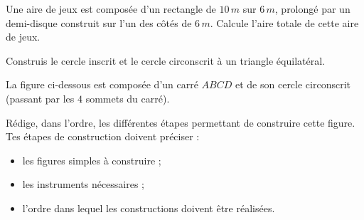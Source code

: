 \documentclass[../../syllabus_1.tex]{subfiles}
\begin{document}
\begin{exercise}
    Une aire de jeux est composée d'un rectangle de $10\,m$ sur $6\,m$, prolongé par un demi-disque construit sur l'un des côtés de $6\,m$. Calcule l'aire totale de cette aire de jeux.
    \begin{center}
    \end{center}
    \vspace{2cm}
\end{exercise}

\newpage
\begin{exercise}
    Construis le cercle inscrit et le cercle circonscrit à un triangle équilatéral.
\end{exercise}

\begin{exercise}
    La figure ci-dessous est composée d'un carré $ABCD$ et de son cercle circonscrit (passant par les $4$ sommets du carré).
    \begin{center}
    \end{center}
    Rédige, dans l'ordre, les différentes étapes permettant de construire cette figure. Tes étapes de construction doivent préciser :
    \begin{itemize}
        \item les figures simples à construire ;
        \item les instruments nécessaires ;
        \item l'ordre dans lequel les constructions doivent être réalisées.
    \end{itemize}
\end{exercise}
\end{document}
